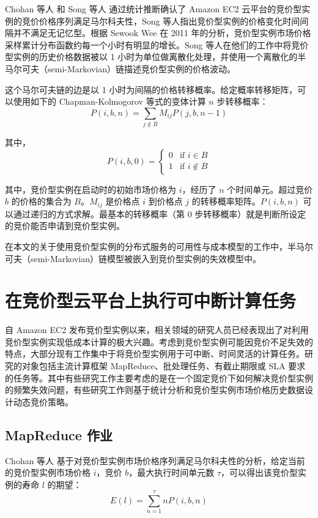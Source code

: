 Chohan 等人 \cite{chohan2010see} 和 Song 等人 \cite{song2012optimal} 通过统计推断确认了 Amazon EC2 云平台的竞价型实例的竞价价格序列满足马尔科夫性，Song 等人指出竞价型实例的价格变化时间间隔并不满足无记忆型。根据 Sewook Wee \cite{5948651} 在 2011 年的分析，竞价型实例市场价格采样累计分布函数约每一个小时有明显的增长。Song 等人在他们的工作中将竞价型实例的历史价格数据被以 1 小时为单位做离散化处理，并使用一个离散化的半马尔可夫（semi-Markovian）链描述竞价型实例的价格波动。

这个马尔可夫链的边是以 1 小时为间隔的价格转移概率。给定概率转移矩阵，可以使用如下的 Chapman-Kolmogorov 等式的变体计算 $n$ 步转移概率：
\begin{equation}\label{eq_ck}\nonumber 
P(i, b, n) = \sum_{j \notin B}{M_{ij}P(j, b, n-1)}
\end{equation}

其中，
\begin{equation}\label{eq_ckcond}\nonumber 
P(i, b, 0) = \begin{cases}
0 &\mbox{if $i \in B$}\\
1 &\mbox{if $i \notin B$}
\end{cases}
\end{equation}

其中，竞价型实例在启动时的初始市场价格为 $i$，经历了 $n$ 个时间单元。超过竞价 $b$ 的价格的集合为 $B$。$M_{ij}$ 是价格点 $i$ 到价格点 $j$ 的转移概率矩阵。$P(i, b, n)$ 可以通过递归的方式求解。最基本的转移概率（第 0 步转移概率）就是判断所设定的竞价能否申请到竞价型实例。

在本文的关于使用竞价型实例的分布式服务的可用性与成本模型的工作中，半马尔可夫（semi-Markovian）链模型被嵌入到竞价型实例的失效模型中。

\section{在竞价型云平台上执行可中断计算任务}
自 Amazon EC2 发布竞价型实例以来，相关领域的研究人员已经表现出了对利用竞价型实例实现低成本计算的极大兴趣。考虑到竞价型实例可能因竞价不足失效的特点，大部分现有工作集中于将竞价型实例用于可中断、时间灵活的计算任务。研究的对象包括主流计算框架 MapReduce、批处理任务、有截止期限或 SLA 要求的任务等。其中有些研究工作主要考虑的是在一个固定竞价下如何解决竞价型实例的频繁失效问题，有些研究工作则基于统计分析和竞价型实例市场价格历史数据设计动态竞价策略。

\subsection{MapReduce 作业}
Chohan 等人 \cite{chohan2010see} 基于对竞价型实例市场价格序列满足马尔科夫性的分析，给定当前的竞价型实例市场价格 $i$，竞价 $b$，最大执行时间单元数 $\tau$，可以得出该竞价型实例的寿命 $l$ 的期望：
\begin{equation}\label{eq_elife}\nonumber 
E(l) = \sum_{n=1}^{\tau}nP(i, b, n)
\end{equation}

